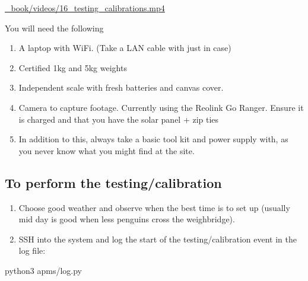 \documentclass[
  letterpaper,
]{scrbook}
\newenvironment{Shaded}{\begin{snugshade}}{\end{snugshade}}
\newcommand{\ExtensionTok}[1]{\textcolor[rgb]{0.00,0.23,0.31}{#1}}
\newcommand{\NormalTok}[1]{\textcolor[rgb]{0.00,0.23,0.31}{#1}}
\begin{document}
\url{_book/videos/16_testing_calibrations.mp4}

You will need the following

\begin{enumerate}
\def\labelenumi{\arabic{enumi}.}
\item
  A laptop with WiFi. (Take a LAN cable with just in case)
\item
  Certified 1kg and 5kg weights
\item
  Independent scale with fresh batteries and canvas cover.
\item
  Camera to capture footage. Currently using the Reolink Go Ranger.
  Ensure it is charged and that you have the solar panel + zip ties
\item
  In addition to this, always take a basic tool kit and power supply
  with, as you never know what you might find at the site.
\end{enumerate}

\subsection{To perform the
testing/calibration}\label{to-perform-the-testingcalibration}

\begin{enumerate}
\def\labelenumi{\arabic{enumi}.}
\item
  Choose good weather and observe when the best time is to set up
  (usually mid day is good when less penguins cross the weighbridge).
\item
  SSH into the system and log the start of the testing/calibration event
  in the log file:
\end{enumerate}

\begin{Shaded}
\begin{Highlighting}[]
\ExtensionTok{python3}\NormalTok{ apms/log.py}
\end{Highlighting}
\end{Shaded}
\end{document}
